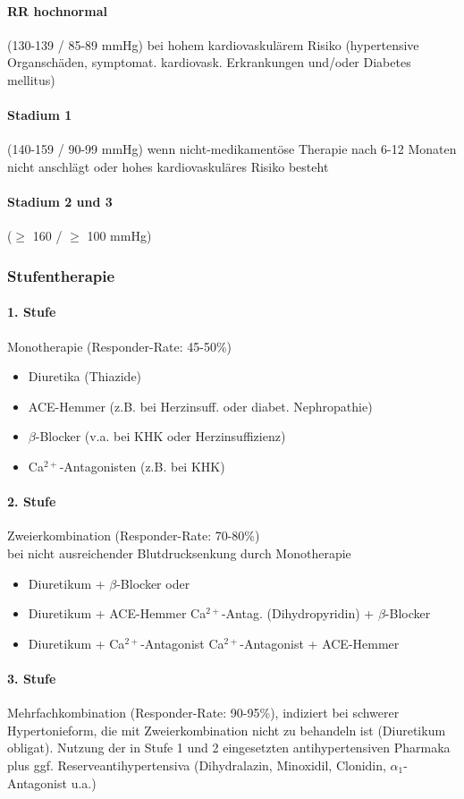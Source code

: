 \documentclass[10pt,a4paper]{report}
\begin{document}
\paragraph{RR hochnormal} (130-139 / 85-89 mmHg)
bei hohem kardiovaskulärem Risiko (hypertensive Organschäden, symptomat. kardiovask. Erkrankungen und/oder Diabetes mellitus)
\paragraph{Stadium 1} (140-159 / 90-99 mmHg)
	wenn nicht-medikamentöse Therapie nach 6-12 Monaten nicht anschlägt 	oder hohes kardiovaskuläres Risiko besteht
\paragraph{Stadium 2 und 3} ($\geq$ 160 / $\geq$ 100 mmHg)
\subsubsection{Stufentherapie}
\paragraph{1. Stufe} 	Monotherapie (Responder-Rate: 45-50\%)
\begin{itemize}
	\item Diuretika (Thiazide)
	\item ACE-Hemmer (z.B. bei Herzinsuff. oder diabet. Nephropathie)
	\item $\beta$-Blocker (v.a. bei KHK oder Herzinsuffizienz)
	\item Ca$^{2+}$-Antagonisten (z.B. bei KHK)
\end{itemize}		
\paragraph{2. Stufe} 	Zweierkombination (Responder-Rate: 70-80\%) \\
bei nicht ausreichender Blutdrucksenkung durch Monotherapie
\begin{itemize}
	\item Diuretikum + $\beta$-Blocker oder
	\item Diuretikum + ACE-Hemmer Ca$^{2+}$-Antag. (Dihydropyridin) + $\beta$-Blocker			\item Diuretikum +	Ca$^{2+}$-Antagonist	Ca$^{2+}$-Antagonist + ACE-Hemmer
\end{itemize}		
\paragraph{3. Stufe} Mehrfachkombination (Responder-Rate: 90-95\%), indiziert bei schwerer Hypertonieform, die mit Zweierkombination nicht zu behandeln ist (Diuretikum obligat). Nutzung der in Stufe 1 und 2 eingesetzten antihypertensiven Pharmaka  plus ggf. Reserveantihypertensiva (Dihydralazin, Minoxidil, Clonidin, $\alpha_1$-Antagonist u.a.)
\end{document}
